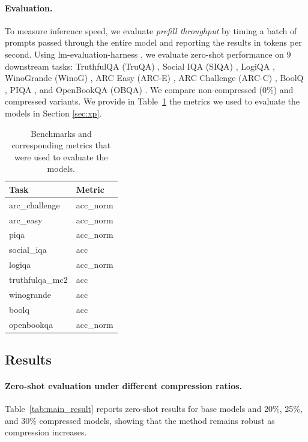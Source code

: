 \paragraph{Evaluation.}
To measure inference speed, we evaluate \textit{prefill throughput} by timing a batch of prompts passed through the entire model and reporting the results in tokens per second. Using lm-evaluation-harness \citep{eval-harness}, we evaluate zero-shot performance on 9 downstream tasks: TruthfulQA (TruQA) \citep{lin-etal-2022-truthfulqa}, Social IQA (SIQA) \citep{sap2019social}, LogiQA \citep{liu2020logiqa}, WinoGrande (WinoG) \citep{sakaguchi2019winogrande}, ARC Easy (ARC-E) \citep{arc}, ARC Challenge (ARC-C) \citep{arc}, BoolQ \citep{boolq}, PIQA \citep{piqa}, and OpenBookQA (OBQA) \citep{obqa}. We compare non-compressed (0\%) and compressed variants.
We provide in Table~\ref{tab:task_metric_map} the metrics we used to evaluate the models in Section \ref{sec:xp}.
\begin{table}[!ht]
\centering
    \begin{tabular}{ll}
    \toprule
    \textbf{Task} & \textbf{Metric} \\ 
    \midrule
    arc\_challenge   & acc\_norm \\ 
    arc\_easy        & acc\_norm \\ 
    piqa             & acc\_norm \\ 
    social\_iqa      & acc \\ 
    logiqa           & acc\_norm \\ 
    truthfulqa\_mc2  & acc \\ 
    winogrande       & acc \\ 
    boolq            & acc \\ 
    openbookqa       & acc\_norm \\ 
    \bottomrule
    \end{tabular}
\caption{Benchmarks and corresponding metrics that were used to evaluate the models.}
\label{tab:task_metric_map}
\end{table}

\subsection{Results}
\paragraph{Zero-shot evaluation under different compression ratios.}
Table~\ref{tab:main_result} reports zero-shot results for base models and 20\%, 25\%, and 30\% compressed models, showing that the method remains robust as compression increases.

